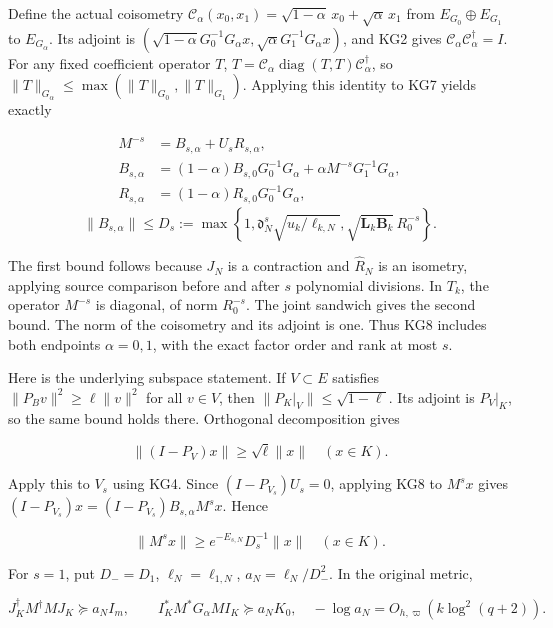 \documentclass[11pt]{article}
\begin{document}
Define the actual coisometry \(\mathcal C_\alpha(x_0,x_1)=\sqrt{1-\alpha}\,x_0+\sqrt\alpha\,x_1\) from \(E_{G_0}\oplus E_{G_1}\) to \(E_{G_\alpha}\). Its adjoint is \((\sqrt{1-\alpha}G_0^{-1}G_\alpha x,\sqrt\alpha G_1^{-1}G_\alpha x)\), and KG2 gives \(\mathcal C_\alpha\mathcal C_\alpha^\dagger=I\). For any fixed coefficient operator \(T\), \(T=\mathcal C_\alpha\operatorname{diag}(T,T)\mathcal C_\alpha^\dagger\), so \(\|T\|_{G_\alpha}\le\max(\|T\|_{G_0},\|T\|_{G_1})\). Applying this identity to KG7 yields exactly

\[
\begin{split}
M^{-s}&=B_{s,\alpha}+U_sR_{s,\alpha},\\
B_{s,\alpha}&=(1-\alpha)B_{s,0}G_0^{-1}G_\alpha
 +\alpha M^{-s}G_1^{-1}G_\alpha,\\
R_{s,\alpha}&=(1-\alpha)R_{s,0}G_0^{-1}G_\alpha,
\end{split}
\] \[
\|B_{s,\alpha}\|\le D_s:=
\max\left\{1,\mathfrak d_N^s\sqrt{u_k/\ell_{k,N}},
\sqrt{\mathbf L_k\mathbf B_k}\,R_0^{-s}\right\}.
\tag{KG8}
\]

The first bound follows because \(J_N\) is a contraction and \(\widehat R_N\) is an isometry, applying source comparison before and after \(s\) polynomial divisions. In \(T_k\), the operator \(M^{-s}\) is diagonal, of norm \(R_0^{-s}\). The joint sandwich gives the second bound. The norm of the coisometry and its adjoint is one. Thus KG8 includes both endpoints \(\alpha=0,1\), with the exact factor order and rank at most \(s\).

Here is the underlying subspace statement. If \(V\subset E\) satisfies \(\|P_Bv\|^2\ge\ell\|v\|^2\) for all \(v\in V\), then \(\|P_K|_V\|\le\sqrt{1-\ell}\). Its adjoint is \(P_V|_K\), so the same bound holds there. Orthogonal decomposition gives

\[
\|(I-P_V)x\|\ge\sqrt\ell\|x\|\quad(x\in K).
\tag{KG9}
\]

Apply this to \(V_s\) using KG4. Since \((I-P_{V_s})U_s=0\), applying KG8 to \(M^sx\) gives \((I-P_{V_s})x=(I-P_{V_s})B_{s,\alpha}M^sx\). Hence

\[
\boxed{\|M^sx\|\ge e^{-E_{s,N}}D_s^{-1}\|x\|\quad(x\in K).}
\tag{KG10}
\]

For \(s=1\), put \(D_-=D_1\), \(\ell_N=\ell_{1,N}\), \(a_N=\ell_N/D_-^2\). In the original metric,

\[
\boxed{J_K^\dagger M^\dagger MJ_K\succeq a_NI_m,
\qquad I_K^*M^*G_\alpha MI_K\succeq a_NK_0,
\quad -\log a_N=O_{h,\varpi}(k\log^2(q+2)).}
\tag{KG11}
\]
\end{document}

